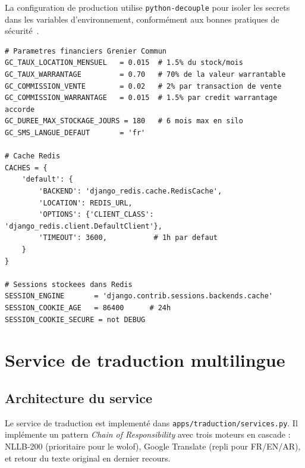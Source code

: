 \documentclass[12pt,a4paper,twoside]{report}
\begin{document}
La configuration de production utilise \texttt{python-decouple} pour
isoler les secrets dans les variables d'environnement, conformément
aux bonnes pratiques de sécurité~\cite{owasp2021top10}.

\begin{lstlisting}[style=pythonstyle, caption={Extrait de \texttt{config/settings.py} --- constantes métier}]
# Parametres financiers Grenier Commun
GC_TAUX_LOCATION_MENSUEL   = 0.015  # 1.5% du stock/mois
GC_TAUX_WARRANTAGE         = 0.70   # 70% de la valeur warrantable
GC_COMMISSION_VENTE        = 0.02   # 2% par transaction de vente
GC_COMMISSION_WARRANTAGE   = 0.015  # 1.5% par credit warrantage accorde
GC_DUREE_MAX_STOCKAGE_JOURS = 180   # 6 mois max en silo
GC_SMS_LANGUE_DEFAUT       = 'fr'

# Cache Redis
CACHES = {
    'default': {
        'BACKEND': 'django_redis.cache.RedisCache',
        'LOCATION': REDIS_URL,
        'OPTIONS': {'CLIENT_CLASS': 'django_redis.client.DefaultClient'},
        'TIMEOUT': 3600,           # 1h par defaut
    }
}

# Sessions stockees dans Redis
SESSION_ENGINE       = 'django.contrib.sessions.backends.cache'
SESSION_COOKIE_AGE   = 86400      # 24h
SESSION_COOKIE_SECURE = not DEBUG
\end{lstlisting}
\vspace{-6pt}
\section{Service de traduction multilingue}
\label{sec:service_traduction}

\subsection{Architecture du service}

Le service de traduction est implementé dans \texttt{apps/traduction/services.py}.
Il implémente un pattern \emph{Chain of Responsibility} avec trois moteurs
en cascade : NLLB-200 (prioritaire pour le wolof), Google Translate (repli
pour FR/EN/AR), et retour du texte original en dernier recours.
\end{document}
